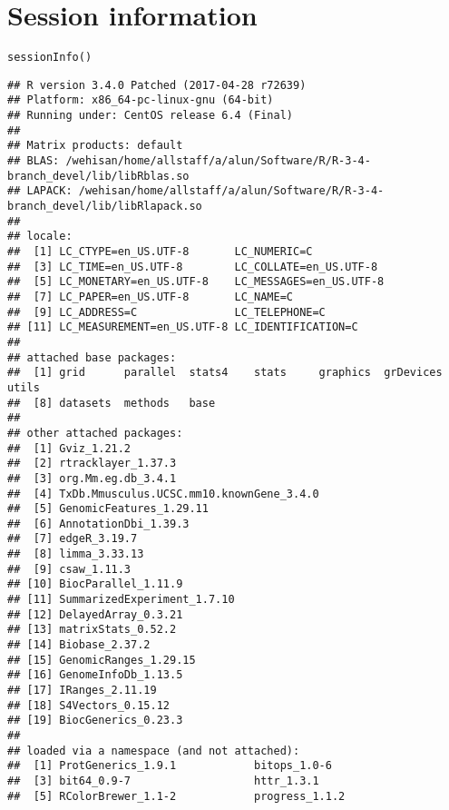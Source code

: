 \documentclass{report}\usepackage[]{graphicx}\usepackage[usenames,dvipsnames]{color}
\newcommand{\hlstd}[1]{\textcolor[rgb]{0.251,0.251,0.251}{#1}}%
\newcommand{\hlkwd}[1]{\textcolor[rgb]{0.878,0.439,0.125}{#1}}%
\newenvironment{knitrout}{}{} %
\begin{document}
\section{Session information}
\begin{knitrout}
\color{fgcolor}\begin{kframe}
\begin{alltt}
\hlkwd{sessionInfo}\hlstd{()}
\end{alltt}
\begin{verbatim}
## R version 3.4.0 Patched (2017-04-28 r72639)
## Platform: x86_64-pc-linux-gnu (64-bit)
## Running under: CentOS release 6.4 (Final)
## 
## Matrix products: default
## BLAS: /wehisan/home/allstaff/a/alun/Software/R/R-3-4-branch_devel/lib/libRblas.so
## LAPACK: /wehisan/home/allstaff/a/alun/Software/R/R-3-4-branch_devel/lib/libRlapack.so
## 
## locale:
##  [1] LC_CTYPE=en_US.UTF-8       LC_NUMERIC=C              
##  [3] LC_TIME=en_US.UTF-8        LC_COLLATE=en_US.UTF-8    
##  [5] LC_MONETARY=en_US.UTF-8    LC_MESSAGES=en_US.UTF-8   
##  [7] LC_PAPER=en_US.UTF-8       LC_NAME=C                 
##  [9] LC_ADDRESS=C               LC_TELEPHONE=C            
## [11] LC_MEASUREMENT=en_US.UTF-8 LC_IDENTIFICATION=C       
## 
## attached base packages:
##  [1] grid      parallel  stats4    stats     graphics  grDevices utils    
##  [8] datasets  methods   base     
## 
## other attached packages:
##  [1] Gviz_1.21.2                             
##  [2] rtracklayer_1.37.3                      
##  [3] org.Mm.eg.db_3.4.1                      
##  [4] TxDb.Mmusculus.UCSC.mm10.knownGene_3.4.0
##  [5] GenomicFeatures_1.29.11                 
##  [6] AnnotationDbi_1.39.3                    
##  [7] edgeR_3.19.7                            
##  [8] limma_3.33.13                           
##  [9] csaw_1.11.3                             
## [10] BiocParallel_1.11.9                     
## [11] SummarizedExperiment_1.7.10             
## [12] DelayedArray_0.3.21                     
## [13] matrixStats_0.52.2                      
## [14] Biobase_2.37.2                          
## [15] GenomicRanges_1.29.15                   
## [16] GenomeInfoDb_1.13.5                     
## [17] IRanges_2.11.19                         
## [18] S4Vectors_0.15.12                       
## [19] BiocGenerics_0.23.3                     
## 
## loaded via a namespace (and not attached):
##  [1] ProtGenerics_1.9.1            bitops_1.0-6                 
##  [3] bit64_0.9-7                   httr_1.3.1                   
##  [5] RColorBrewer_1.1-2            progress_1.1.2               

\end{verbatim}
\end{kframe}
\end{knitrout}
\end{document}
